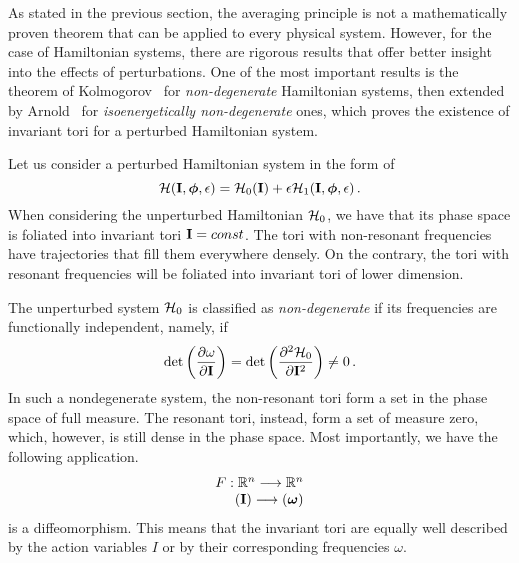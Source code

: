 As stated in the previous section, the averaging principle is not a mathematically proven theorem that can be applied to every physical system. However, for the case of Hamiltonian systems, there are rigorous results that offer better insight into the effects of perturbations. One of the most important results is the theorem of Kolmogorov~\cite{KAM1} for \textit{non-degenerate} Hamiltonian systems, then extended by Arnold~\cite{KAM3} for \textit{isoenergetically non-degenerate} ones, which proves the existence of invariant tori for a perturbed Hamiltonian system.

Let us consider a perturbed Hamiltonian system in the form of
\begin{equation}
    \mathcal{H}(\vb{I}, \boldsymbol{\phi}, \epsilon) = \mathcal{H}_0(\vb{I}) + \epsilon\mathcal{H}_1(\vb{I},\boldsymbol{\phi},\epsilon)\,.
    \label{eq:1:hamperturbed}
\end{equation}
When considering the unperturbed Hamiltonian $\mathcal{H}_0$, we have that its phase space is foliated into invariant tori $\vb{I}=const$. The tori with non-resonant frequencies have trajectories that fill them everywhere densely. On the contrary, the tori with resonant frequencies will be foliated into invariant tori of lower dimension.

The unperturbed system $\mathcal{H}_0$ is classified as \textit{non-degenerate} if its frequencies are functionally independent, namely, if
\begin{equation}
    \det\left(\pdv{\omega}{\vb{I}}\right) = \det\left(\pdv[2]{\mathcal{H}_0}{\vb{I}}\right) \neq 0 \,.
\end{equation}
In such a nondegenerate system, the non-resonant tori form a set in the phase space of full measure. The resonant tori, instead, form a set of measure zero, which, however, is still dense in the phase space. Most importantly, we have the following application.
\begin{equation}
    \begin{array}{r}
    F: \mathbb{R}^{n} \longrightarrow \mathbb{R}^n \\
    (\vb{I}) \longrightarrow(\boldsymbol{\omega})
    \end{array}
\end{equation}
is a diffeomorphism. This means that the invariant tori are equally well described by the action variables $I$ or by their corresponding frequencies $\omega$.

